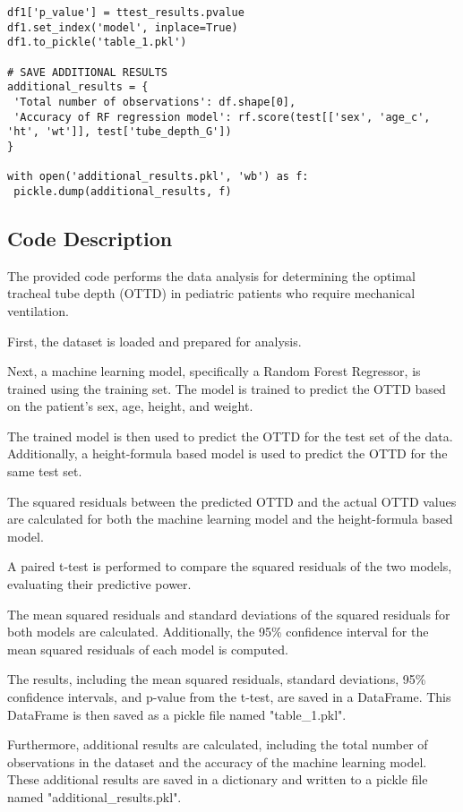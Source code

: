 \documentclass[11pt]{article}
\begin{document}
\begin{verbatim}
df1['p_value'] = ttest_results.pvalue
df1.set_index('model', inplace=True)
df1.to_pickle('table_1.pkl')

# SAVE ADDITIONAL RESULTS
additional_results = {
 'Total number of observations': df.shape[0], 
 'Accuracy of RF regression model': rf.score(test[['sex', 'age_c', 'ht', 'wt']], test['tube_depth_G'])
}

with open('additional_results.pkl', 'wb') as f:
 pickle.dump(additional_results, f)

\end{verbatim}

\subsection{Code Description}

The provided code performs the data analysis for determining the optimal tracheal tube depth (OTTD) in pediatric patients who require mechanical ventilation. 

First, the dataset is loaded and prepared for analysis. 

Next, a machine learning model, specifically a Random Forest Regressor, is trained using the training set. The model is trained to predict the OTTD based on the patient's sex, age, height, and weight.

The trained model is then used to predict the OTTD for the test set of the data. Additionally, a height-formula based model is used to predict the OTTD for the same test set.

The squared residuals between the predicted OTTD and the actual OTTD values are calculated for both the machine learning model and the height-formula based model. 

A paired t-test is performed to compare the squared residuals of the two models, evaluating their predictive power.

The mean squared residuals and standard deviations of the squared residuals for both models are calculated. Additionally, the 95\% confidence interval for the mean squared residuals of each model is computed.

The results, including the mean squared residuals, standard deviations, 95\% confidence intervals, and p-value from the t-test, are saved in a DataFrame. This DataFrame is then saved as a pickle file named "table\_1.pkl".

Furthermore, additional results are calculated, including the total number of observations in the dataset and the accuracy of the machine learning model. These additional results are saved in a dictionary and written to a pickle file named "additional\_results.pkl".
\end{document}
